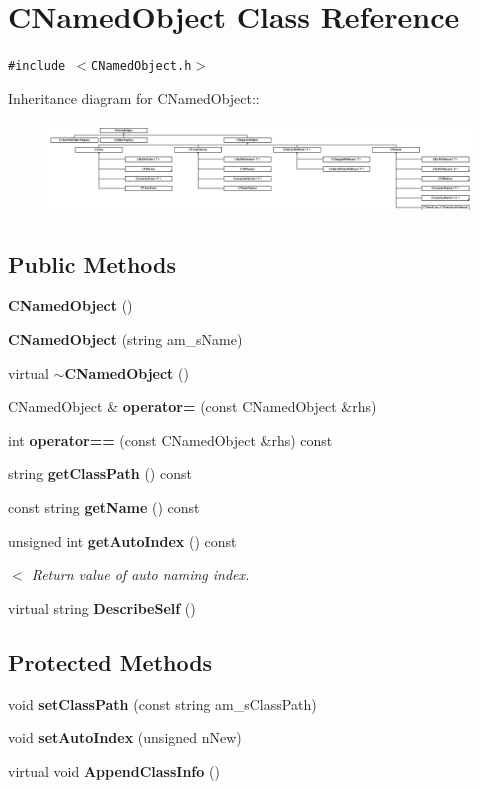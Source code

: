 \section{CNamed\-Object  Class Reference}
\label{classCNamedObject}
{\tt \#include $<$CNamed\-Object.h$>$}

Inheritance diagram for CNamed\-Object::\begin{figure}[H]
\begin{center}
\leavevmode
\includegraphics[height=2.46696cm]{classCNamedObject}
\end{center}
\end{figure}
\subsection*{Public Methods}
\begin{CompactItemize}
\item 
{\bf CNamed\-Object} ()
\item 
{\bf CNamed\-Object} (string am\_\-s\-Name)
\item 
virtual {\bf $\sim$CNamed\-Object} ()
\item 
CNamed\-Object \& {\bf operator=} (const CNamed\-Object \&rhs)
\item 
int {\bf operator==} (const CNamed\-Object \&rhs) const
\item 
string {\bf get\-Class\-Path} () const
\item 
const string {\bf get\-Name} () const
\item 
unsigned int {\bf get\-Auto\-Index} () const
\begin{CompactList}\small\item\em $<$ Return value of auto naming index.\item\end{CompactList}\item 
virtual string {\bf Describe\-Self} ()
\end{CompactItemize}
\subsection*{Protected Methods}
\begin{CompactItemize}
\item 
void {\bf set\-Class\-Path} (const string am\_\-s\-Class\-Path)
\item 
void {\bf set\-Auto\-Index} (unsigned n\-New)
\item 
virtual void {\bf Append\-Class\-Info} ()
\end{CompactItemize}
